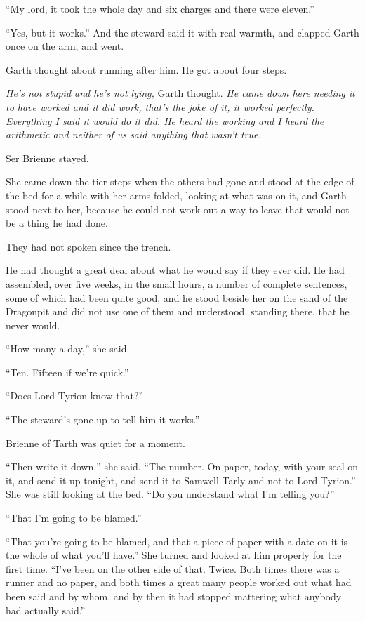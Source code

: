 “My lord, it took the whole day and six charges and there were eleven.”

“Yes, but it works.” And the steward said it with real warmth, and clapped Garth once on the arm, and went.

Garth thought about running after him. He got about four steps.

\textit{He’s not stupid and he’s not lying,} Garth thought. \textit{He came down here needing it to have worked and it did work, that’s the joke of it, it worked perfectly. Everything I said it would do it did. He heard the working and I heard the arithmetic and neither of us said anything that wasn’t true.}

\sceneBreak

Ser Brienne stayed.

She came down the tier steps when the others had gone and stood at the edge of the bed for a while with her arms folded, looking at what was on it, and Garth stood next to her, because he could not work out a way to leave that would not be a thing he had done.

They had not spoken since the trench.

He had thought a great deal about what he would say if they ever did. He had assembled, over five weeks, in the small hours, a number of complete sentences, some of which had been quite good, and he stood beside her on the sand of the Dragonpit and did not use one of them and understood, standing there, that he never would.

“How many a day,” she said.

“Ten. Fifteen if we’re quick.”

“Does Lord Tyrion know that?”

“The steward’s gone up to tell him it works.”

Brienne of Tarth was quiet for a moment.

“Then write it down,” she said. “The number. On paper, today, with your seal on it, and send it up tonight, and send it to Samwell Tarly and not to Lord Tyrion.” She was still looking at the bed. “Do you understand what I’m telling you?”

“That I’m going to be blamed.”

“That you’re going to be blamed, and that a piece of paper with a date on it is the whole of what you’ll have.” She turned and looked at him properly for the first time. “I’ve been on the other side of that. Twice. Both times there was a runner and no paper, and both times a great many people worked out what had been said and by whom, and by then it had stopped mattering what anybody had actually said.”


